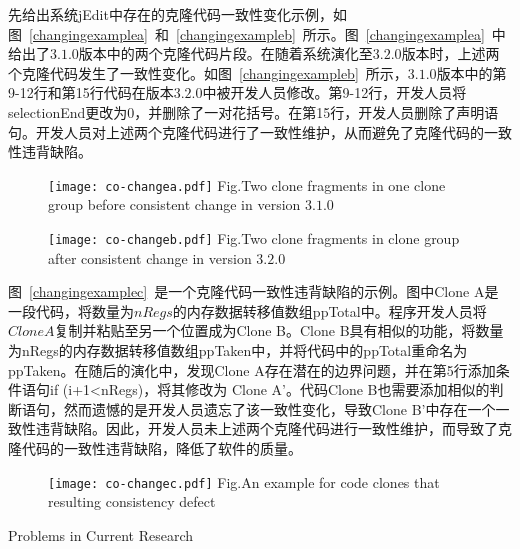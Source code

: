 先给出系统jEdit中存在的克隆代码一致性变化示例，如图~\ref{changingexamplea}~和~\ref{changingexampleb}~所示。图~\ref{changingexamplea}~中给出了$ 3.1.0 $版本中的两个克隆代码片段。在随着系统演化至$3.2.0$版本时，上述两个克隆代码发生了一致性变化。如图~\ref{changingexampleb}~所示，$ 3.1.0 $版本中的第9-12行和第15行代码在版本$ 3.2.0$中被开发人员修改。第9-12行，开发人员将{selectionEnd}更改为$0$，并删除了一对花括号。在第15行，开发人员删除了声明语句。开发人员对上述两个克隆代码进行了一致性维护，从而避免了克隆代码的一致性违背缺陷。

\begin{figure}[htbp]
\centering
\texttt{[image: co-changea.pdf]}
{Fig.$\!$}{Two clone fragments in one clone group before consistent change in version $3.1.0$}
\vspace{-1em}
\end{figure}

\begin{figure}[htbp]
\centering
\texttt{[image: co-changeb.pdf]}
{Fig.$\!$}{Two clone fragments in clone group after consistent change in version $3.2.0$}
\vspace{-1em}
\end{figure}

图~\ref{changingexamplec}~是一个克隆代码一致性违背缺陷的示例。图中Clone A是一段代码，将数量为$nRegs$的内存数据转移值数组{ppTotal}中。程序开发人员将$Clone A$复制并粘贴至另一个位置成为Clone B。Clone B具有相似的功能，将数量为{nRegs}的内存数据转移值数组{ppTaken}中，并将代码中的{ppTotal}重命名为{ppTaken}。在随后的演化中，发现Clone A存在潜在的边界问题，并在第5行添加条件语句{if (i+1<nRegs)}，将其修改为 Clone A'。代码Clone B也需要添加相似的判断语句，然而遗憾的是开发人员遗忘了该一致性变化，导致Clone B'中存在一个一致性违背缺陷。因此，开发人员未上述两个克隆代码进行一致性维护，而导致了克隆代码的一致性违背缺陷，降低了软件的质量。

\begin{figure}[htbp]
\centering
\texttt{[image: co-changec.pdf]}
{Fig.$\!$}{An example for code clones that resulting consistency defect\cite{nguyen2012clone}}
\vspace{-1em}
\end{figure}

{Problems in Current Research}

